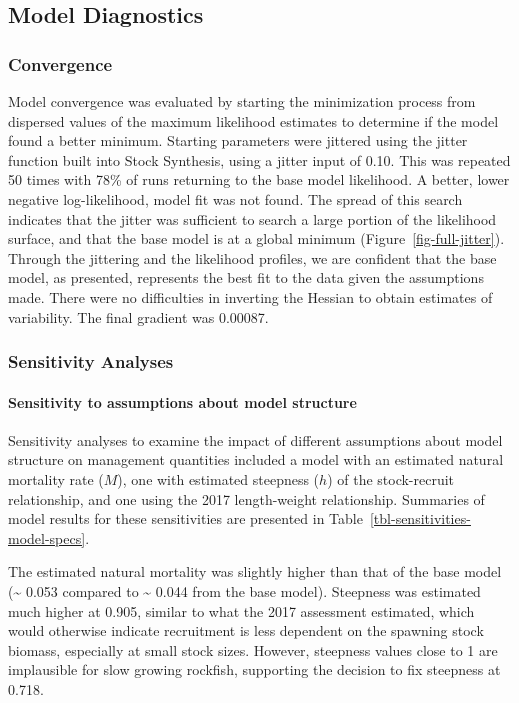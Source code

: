 \documentclass[
]{scrartcl}
\let\oldparagraph\paragraph
\renewcommand{\paragraph}[1]{\oldparagraph{#1}\mbox{}}
\begin{document}
\subsection{Model Diagnostics}\label{model-diagnostics}

\subsubsection{Convergence}\label{convergence}

Model convergence was evaluated by starting the minimization process
from dispersed values of the maximum likelihood estimates to determine
if the model found a better minimum. Starting parameters were jittered
using the jitter function built into Stock Synthesis, using a jitter
input of 0.10. This was repeated 50 times with 78\% of runs returning to
the base model likelihood. A better, lower negative log-likelihood,
model fit was not found. The spread of this search indicates that the
jitter was sufficient to search a large portion of the likelihood
surface, and that the base model is at a global minimum
(Figure~\ref{fig-full-jitter}). Through the jittering and the likelihood
profiles, we are confident that the base model, as presented, represents
the best fit to the data given the assumptions made. There were no
difficulties in inverting the Hessian to obtain estimates of
variability. The final gradient was 0.00087.

\subsubsection{Sensitivity Analyses}\label{sensitivity-analyses}

\paragraph{Sensitivity to assumptions about model
structure}\label{sensitivity-to-assumptions-about-model-structure}

Sensitivity analyses to examine the impact of different assumptions
about model structure on management quantities included a model with an
estimated natural mortality rate (\(M\)), one with estimated steepness
(\(h\)) of the stock-recruit relationship, and one using the 2017
length-weight relationship. Summaries of model results for these
sensitivities are presented in
Table~\ref{tbl-sensitivities-model-specs}.

The estimated natural mortality was slightly higher than that of the
base model (\textasciitilde{} 0.053 compared to \textasciitilde{} 0.044
from the base model). Steepness was estimated much higher at 0.905,
similar to what the 2017 assessment estimated, which would otherwise
indicate recruitment is less dependent on the spawning stock biomass,
especially at small stock sizes. However, steepness values close to 1
are implausible for slow growing rockfish, supporting the decision to
fix steepness at 0.718.
\end{document}

